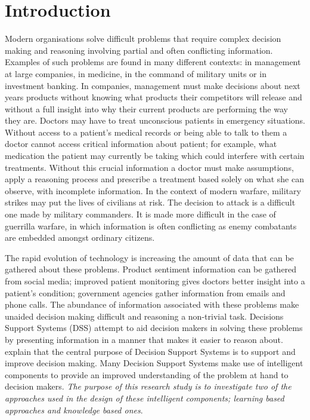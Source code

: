 
\chapter{Introduction} %

\label{Chapter1} %



Modern organisations solve difficult problems that require complex decision making and reasoning involving partial and often conflicting information. Examples of such problems are found in many different contexts: in management at large companies, in medicine, in the command of military units or in investment banking. In companies, management must make decisions about next years products without knowing what products their competitors will release and without a full insight into why their current products are performing the way they are. Doctors may have to treat unconscious patients in emergency situations. Without access to a patient’s medical records or being able to talk to them a doctor cannot access critical information about patient; for example, what medication the patient may currently be taking which could interfere with certain treatments. Without this crucial information a doctor must make assumptions, apply a reasoning process and prescribe a treatment based solely on what she can observe, with incomplete information. In the context of modern warfare, military strikes may put the lives of civilians at risk. The decision to attack is a difficult one made by military commanders. It is made more difficult in the case of guerrilla warfare, in which information is often conflicting as enemy combatants are embedded amongst ordinary citizens. 

The rapid evolution of technology is increasing the amount of data that can be gathered about these problems. Product sentiment information can be gathered from social media; improved patient monitoring gives doctors better insight into a patient’s condition; government agencies gather information from emails and phone calls. The abundance of information associated with these problems make unaided decision making difficult and reasoning a non-trivial task. Decisions Support Systems (DSS) attempt to aid decision makers in solving these problems by presenting information in a manner that makes it easier to reason about. \cite{turban2005decision} explain that the central purpose of Decision Support Systems is to support and improve decision making. Many Decision Support Systems make use of intelligent components to provide an improved understanding of the problem at hand to decision makers. \textit{The purpose of this research study is to investigate two of the approaches used in the design of these intelligent components; learning based approaches and knowledge based ones}.

